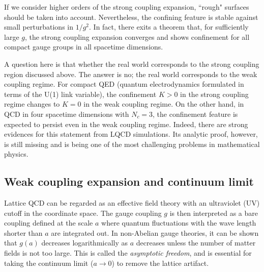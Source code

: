  If we consider higher orders of the strong coupling expansion,
   ``rough" surfaces should be taken 
 into account.
 Nevertheless, the confining feature is
 stable against small perturbations in $1/g^2$.
  In fact, there exits a theorem 
  that,  for sufficiently large $g$, the strong coupling expansion 
  converges and shows confinement for all compact gauge groups  
  in all spacetime dimensions.
  

  A question here is that whether the real world 
  corresponds to the strong coupling region discussed above.
  The answer is no;  the real world corresponds to  the weak coupling regime. 
  For compact QED (quantum electrodynamics
  formulated in terms of the  U(1) link variable),
  the confinement  $K>0$ in the strong coupling regime 
   changes to  $K=0$ in the weak coupling regime.
  On the other hand,  in QCD in four spacetime dimensions 
 with $N_c=3$,   the confinement feature is expected to persist even in the weak coupling regime. 
 Indeed, there are  strong evidences for this statement 
  from  LQCD simulations.
  Its analytic proof, however,  is  still missing and is being one of the 
   most challenging problems in mathematical  physics.
   

\subsection{Weak coupling expansion and continuum limit}

  Lattice QCD can be regarded as an effective field theory
   with an ultraviolet (UV)  cutoff in the coordinate space. 
   The gauge coupling  $g$ is then interpreted as
  a bare coupling defined at the scale $a$ where
  quantum fluctuations with the wave length shorter than 
  $a$ are integrated out.  In non-Abelian gauge theories,
   it can be shown that $g(a)$ decreases logarithmically as $a$ decreases
   unless the number of matter fields is not too large.  
    This is called the {\it asymptotic freedom}, and is essential for taking
    the continuum limit ($a \rightarrow 0$) to remove the 
    lattice artifact. 
        
